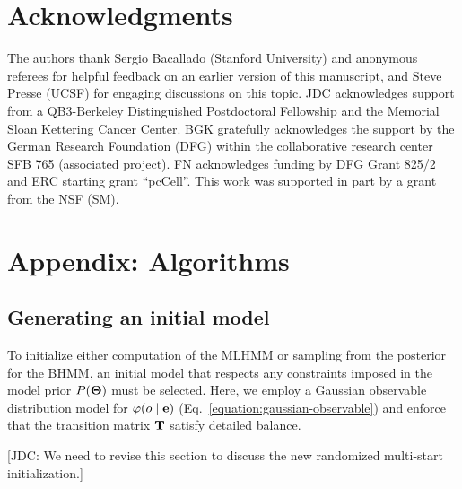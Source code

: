 \documentclass[aps,pre,twocolumn,superscriptaddress,nofootinbib,longbibliography]{revtex4-1}
\newcommand{\bfm}[1]{{\bf #1}}
\begin{document}
{\section{Acknowledgments}
The authors thank Sergio Bacallado (Stanford University) {\color{red}and anonymous referees} for helpful feedback on an earlier version of this manuscript, and Steve Presse (UCSF) for engaging discussions on this topic.
\color{red}
JDC acknowledges support from a QB3-Berkeley Distinguished Postdoctoral Fellowship and the Memorial Sloan Kettering Cancer Center.
BGK gratefully acknowledges the support by the German Research Foundation (DFG) within the collaborative research center SFB 765 (associated project).
\color{black}
FN acknowledges funding by DFG Grant 825/2 and ERC starting grant ``pcCell''.
This work was supported in part by a grant from the NSF (SM).





\section{Appendix: Algorithms}
\label{section:algorithms}

\subsection{Generating an initial model}

To initialize either computation of the MLHMM or sampling from the posterior for the BHMM, an initial model that respects any constraints imposed in the model prior $P(\bfm{\Theta})$ must be selected.
Here, we employ a Gaussian observable distribution model for $\varphi(o \mid \bfm{e})$ (Eq.~\ref{equation:gaussian-observable}) and enforce that the transition matrix $\bfm{T}$ satisfy detailed balance.

{\color{blue}[JDC: We need to revise this section to discuss the new randomized multi-start initialization.]}

}
\end{document}
